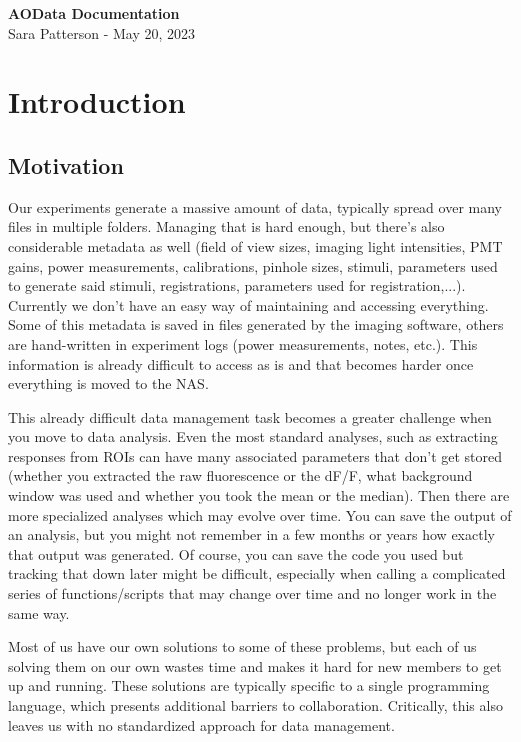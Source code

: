 \documentclass[10pt]{exam}
\begin{document}
	\noindent 
	\begin{center}
		{\LARGE\textbf{AOData Documentation}}
		\\\vspace{1.5ex}
		{\large Sara Patterson - May 20, 2023}
	\end{center}
	
	\tableofcontents
	\pagebreak 

\section{Introduction}
	\subsection{Motivation}
		\noindent Our experiments generate a massive amount of data, typically spread over many files in multiple folders. Managing that is hard enough, but there's also considerable metadata as well (field of view sizes, imaging light intensities, PMT gains, power measurements, calibrations, pinhole sizes, stimuli, parameters used to generate said stimuli, registrations, parameters used for registration,...). Currently we don't have an easy way of maintaining and accessing everything. Some of this metadata is saved in files generated by the imaging software, others are hand-written in experiment logs (power measurements, notes, etc.). This information is already difficult to access as is and that becomes harder once everything is moved to the NAS. 
		
		This already difficult data management task becomes a greater challenge when you move to data analysis. Even the most standard analyses, such as extracting responses from ROIs can have many associated parameters that don't get stored (whether you extracted the raw fluorescence or the dF/F, what background window was used and whether you took the mean or the median). Then there are more specialized analyses which may evolve over time. You can save the output of an analysis, but you might not remember in a few months or years how exactly that output was generated. Of course, you can save the code you used but tracking that down later might be difficult, especially when calling a complicated series of functions/scripts that may change over time and no longer work in the same way.
		
		Most of us have our own solutions to some of these problems, but each of us solving them on our own wastes time and makes it hard for new members to get up and running. These solutions are typically specific to a single programming language, which presents additional barriers to collaboration. Critically, this also leaves us with no standardized approach for data management. 
		
\end{document}
